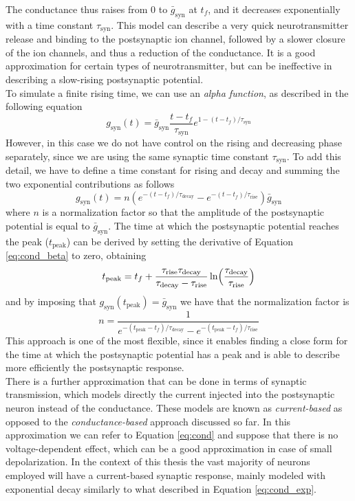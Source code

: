 \documentclass[a4paper, 12pt, twoside, openright]{book}
\begin{document}
The conductance thus raises from 0 to $\bar{g}_{\text{syn}}$ at $t_{f}$, and it decreases exponentially with a time constant $\tau_{\text{syn}}$. This model can describe a very quick neurotransmitter release and binding to the postsynaptic ion channel, followed by a slower closure of the ion channels, and thus a reduction of the conductance. It is a good approximation for certain types of neurotransmitter, but can be ineffective in describing a slow-rising postsynaptic potential.\\
To simulate a finite rising time, we can use an \textit{alpha function}, as described in the following equation
\begin{equation}
\label{eq:cond_alpha}
    g_{\text{syn}}(t) = \bar{g}_{\text{syn}} \dfrac{t-t_{f}}{\tau_{\text{syn}}} e^{1-(t-t_{f})/\tau_{\text{syn}}}
\end{equation}
However, in this case we do not have control on the rising and decreasing phase separately, since we are using the same synaptic time constant $\tau_{\text{syn}}$. To add this detail, we have to define a time constant for rising and decay and summing the two exponential contributions as follows
\begin{equation}
\label{eq:cond_beta}
    g_{\text{syn}}(t) = n( e^{-(t-t_{f})/\tau_{\text{decay}}} - e^{-(t-t_{f})/\tau_{\text{rise}}})\bar{g}_{\text{syn}}
\end{equation}
where $n$ is a normalization factor so that the amplitude of the postsynaptic potential is equal to $\bar{g}_{\text{syn}}$. The time at which the postsynaptic potential reaches the peak ($t_{\text{peak}}$) can be derived by setting the derivative of Equation \eqref{eq:cond_beta} to zero, obtaining
\begin{equation}
    t_{\text{peak}} = t_{f} + \dfrac{\tau_{\text{rise}}\tau_{\text{decay}}}{\tau_{\text{decay}} - \tau_{\text{rise}}}\ln\Bigl( \dfrac{\tau_{\text{decay}}}{\tau_{\text{rise}}} \Bigr)
\end{equation}
and by imposing that $g_{\text{syn}}(t_{\text{peak}})=\bar{g}_{\text{syn}}$ we have that the normalization factor is
\begin{equation}
    n = \dfrac{1}{e^{-(t_{\text{peak}}-t_{f})/\tau_{\text{decay}}} - e^{-(t_{\text{peak}}-t_{f})/\tau_{\text{rise}}}}
\end{equation}
This approach is one of the most flexible, since it enables finding a close form for the time at which the postsynaptic potential has a peak and is able to describe more efficiently the postsynaptic response.\\
There is a further approximation that can be done in terms of synaptic transmission, which models directly the current injected into the postsynaptic neuron instead of the conductance. These models are known as \textit{current-based} as opposed to the \textit{conductance-based} approach discussed so far. In this approximation we can refer to Equation \eqref{eq:cond} and suppose that there is no voltage-dependent effect, which can be a good approximation in case of small depolarization. In the context of this thesis the vast majority of neurons employed will have a current-based synaptic response, mainly modeled with exponential decay similarly to what described in Equation \eqref{eq:cond_exp}.
\end{document}
